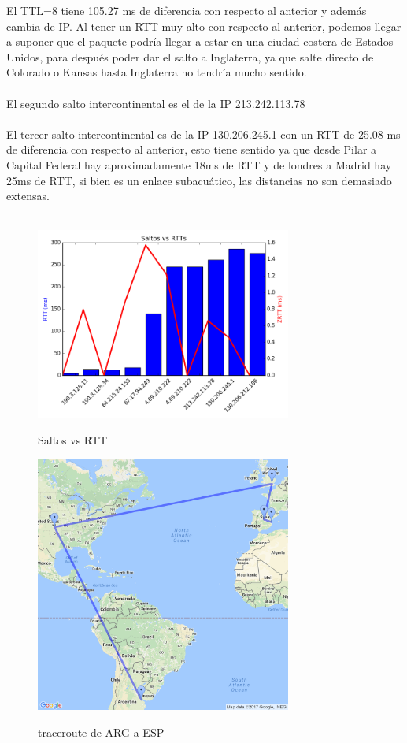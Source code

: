 El TTL=8 tiene 105.27 ms de diferencia con respecto al anterior y además cambia de IP. Al tener un RTT muy alto con respecto al anterior,
podemos llegar a suponer que el paquete podría llegar a estar en una ciudad costera de Estados Unidos, para después poder dar el salto a Inglaterra,
ya que salte directo de Colorado o Kansas hasta Inglaterra no tendría mucho sentido. \\ \\

El segundo salto intercontinental es el de la IP 213.242.113.78 \\ \\

El tercer salto intercontinental es de la IP 130.206.245.1 con un RTT de 25.08 ms de diferencia con respecto al anterior, esto tiene 
sentido ya que desde Pilar a Capital Federal hay aproximadamente 18ms de RTT y de londres a Madrid hay 25ms de RTT, si bien es un enlace subacuático,
las distancias no son demasiado extensas. \\ \\









\pagebreak


\begin{figure}[!h]
\centering
\caption{Saltos vs RTT}
\includegraphics[width=0.75\textwidth]{modules/grafico-rtt-EU}
 \label{fig:grafico-rtt-EU}
\end{figure}

\pagebreak

\begin{figure}[!h]
\centering
\caption{traceroute de ARG a ESP}
\includegraphics[width=0.75\textwidth]{modules/traceroute-EU}
 \label{fig:traceroute-EU}
\end{figure}
